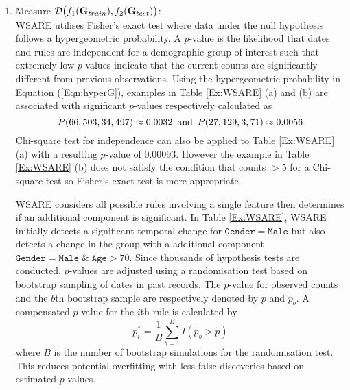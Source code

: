 \begin{enumerate}[3.] 
\item Measure $ \mathcal{D}\big(f_1 ({\bf G}_{train}) , f_2({\bf G}_{test} )\big )$: \\
WSARE utilises Fisher's exact test where data under the null hypothesis follows a hypergeometric probability. 
 A $p$-value is the likelihood that dates  and rules are independent for a demographic group of interest such that extremely low $p$-values indicate that the current counts are significantly different  from  previous observations. Using the hypergeometric probability in Equation (\ref{Eqn:hyperG}),  examples in Table \ref{Ex:WSARE} (a) and  (b) are associated with significant $p$-values  respectively calculated as    \[P(66,503,34,497) \approx  0.0032 \mbox{\, and \,}
P(27,129,3,71) \approx  0.0056
 \]
  Chi-square test for independence can also be applied to Table  \ref{Ex:WSARE} (a) with a resulting $p$-value of 0.00093. 
However the example in Table  \ref{Ex:WSARE} (b) does not satisfy the condition that counts $> 5$ for a Chi-square test so  Fisher's exact test  is more appropriate.  
 

WSARE  considers  all possible rules involving a single  feature   then determines if an additional component is significant. In Table \ref{Ex:WSARE}, WSARE initially  detects a significant temporal change for %
 $\mathtt{Gender} = \mathtt{Male}$ but also detects a change in the group with a additional component  $\mathtt{Gender}   = \mathtt{Male } \; \&  \;  \mathtt{Age} > 70 $. Since thousands of hypothesis tests are conducted, %
   $p$-values are adjusted using  a randomisation test based on bootstrap sampling of dates in past records. %
   The  $p$-value  for observed counts and   the $b$th bootstrap sample are respectively denoted by $\tilde{p}$  and $\tilde{p}_b$. A compensated $p$-value for the $i$th rule is calculated  by    
 \begin{equation}
  p_i^* = \displaystyle  \frac{1}{B} \sum_{b=1}^ B I ( \tilde{p}_b > \tilde{p} )  
  \label{Eqn:CompensatedP}
\end{equation}    
 where $B$ is the number of bootstrap  simulations for the randomisation test.  This reduces potential overfitting with less false discoveries based on estimated $p$-values. 
\end{enumerate}
